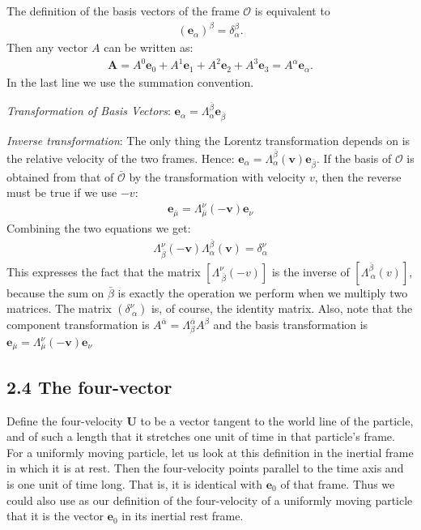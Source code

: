 \documentclass[12pt]{book}
\newcommand{\bm}[1]{\boldsymbol{#1}}
\begin{document}
        The definition of the basis vectors of the frame \( \mathcal{O} \) is equivalent to
        \begin{align}
        (\mathbf{e}_\alpha)^\beta = \delta_\alpha^\beta.
        \end{align}
        Then any vector \(A\) can be written as:
        \begin{align}
        \mathbf{A}= A^0 \mathbf{e}_0 + A^1 \mathbf{e}_1 + A^2 \mathbf{e}_2 + A^3 \mathbf{e}_3 = A^\alpha \mathbf{e}_\alpha.
        \end{align}
        In the last line we use the summation convention.
    
        \textit{Transformation of Basis Vectors}: \quad \( \mathbf{e}_\alpha=\Lambda^{\bar{\beta}}_\alpha \mathbf{e}_{\bar{\beta}}\)

        \textit{Inverse transformation}: The only thing the Lorentz transformation depends on is the relative velocity of the two frames. Hence: \(    \mathbf{e}_\alpha=\Lambda^{\bar{\beta}}_\alpha(\bm{v}) \mathbf{e}_{\bar{\beta}}\). If the basis of \(\mathcal{O}\) is obtained from that of \(\mathcal{\bar{O}}\) by the transformation with velocity \(v\), then the reverse must be true if we use \(-v\):
        \begin{align}
            \mathbf{e}_{\bar{\mu}}=\Lambda^{\nu}_{\bar{\mu}}(\bm{-v}) \mathbf{e}_{\nu}
        \end{align}
        Combining the two equations we get:
        \begin{align}
            \Lambda^{\nu}_{\bar{\beta}} (\bm{-v}) \Lambda^{\bar{\beta}}_{\alpha} (\bm{v}) = \delta^{\nu}_{\alpha}
        \end{align}
        This expresses the fact that the matrix \([\Lambda^\nu_{\ \bar{\beta}}(-v)]\) is the inverse of \([\Lambda^{\bar{\beta}}_{\ \alpha}(v)]\), because the sum on \(\bar{\beta}\) is exactly the operation we perform when we multiply two matrices. The matrix \((\delta^{\nu}_{\ \alpha})\) is, of course, the identity matrix. Also, note that the component transformation is \(A^{\bar{\alpha}}=\Lambda^{\bar{\alpha}}_{\beta} A^{\beta}\) and the basis transformation is \(\mathbf{e}{_{\bar{\mu}}}=\Lambda^{\nu}_{\bar{\mu}}(\bm{-v}) \mathbf{e}_{\nu}\)

    \subsection{2.4 The four-vector}

        Define the four-velocity \( \mathbf{U} \) to be a vector tangent to the world line of the particle, and of such a length that it stretches one unit of time in that particle’s frame. For a uniformly moving particle, let us look at this definition in the inertial frame in which it is at rest. Then the four-velocity points parallel to the time axis and is one unit of time long. That is, it is identical with \( \mathbf{e}_0 \) of that frame. Thus we could also use as our definition of the four-velocity of a uniformly moving particle that it is the vector \( \mathbf{e}_0 \) in its inertial rest frame.
\end{document}
